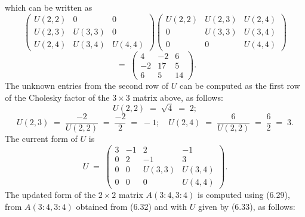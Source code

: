 \]
which can be written as
\[
\begin{pmatrix} U(2,2) & 0 & 0 \\ U(2,3) & U(3,3) & 0 \\ U(2,4) & U(3,4) & U(4,4) \end{pmatrix}
\begin{pmatrix} U(2,2) & U(2,3) & U(2,4) \\ 0 & U(3,3) & U(3,4) \\ 0 & 0 & U(4,4) \end{pmatrix}
\]
\[
\;=\; \begin{pmatrix} 4 & -2 & 6 \\ -2 & 17 & 5 \\ 6 & 5 & 14 \end{pmatrix}.
\]
The unknown entries from the second row of $U$ can be computed as the first row of
the Cholesky factor of the $3 \times 3$ matrix above, as follows:
\[
U(2,2) \;=\; \sqrt{4} \;=\; 2;
\]
\[
U(2,3) \;=\; \frac{-2}{U(2,2)} \;=\; \frac{-2}{2} \;=\; -1; \quad
U(2,4) \;=\; \frac{6}{U(2,2)} \;=\; \frac{6}{2} \;=\; 3.
\]
The current form of $U$ is
\begin{equation}
U \;=\; \begin{pmatrix} 3 & -1 & 2 & -1 \\ 0 & 2 & -1 & 3 \\ 0 & 0 & U(3,3) & U(3,4) \\
0 & 0 & 0 & U(4,4) \end{pmatrix}.
\end{equation}
The updated form of the $2 \times 2$ matrix $A(3:4,3:4)$ is computed using (6.29), from
$A(3:4,3:4)$ obtained from (6.32) and with $U$ given by (6.33), as follows:
